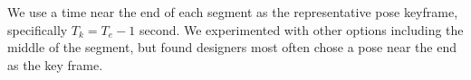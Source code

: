 %



We use a time near the end of each segment as the representative pose keyframe, specifically $T_k = T_e - 1$ second.
We experimented with other options including the middle of the segment, but found designers most often chose a pose near the end as the key frame.

